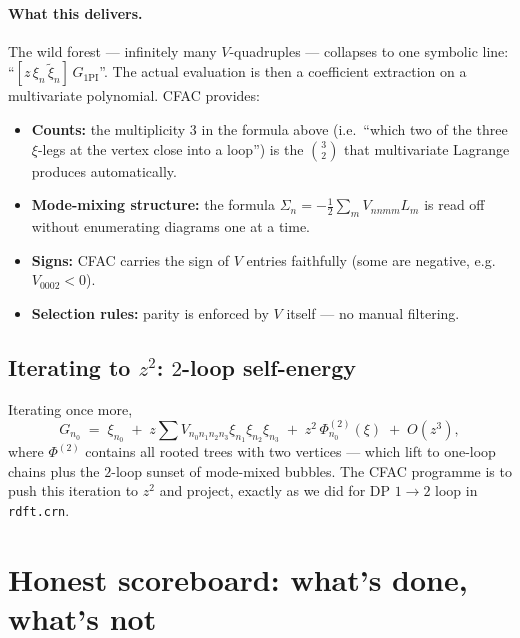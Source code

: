 \documentclass[11pt,a4paper]{article}
\begin{document}
\paragraph{What this delivers.} The wild forest --- infinitely many $V$-quadruples ---
collapses to one symbolic line: ``$[z\,\xi_{n}\,\widetilde\xi_{n}]\,G_{\text{1PI}}$''.
The actual evaluation is then a coefficient extraction on a multivariate polynomial. CFAC
provides:
\begin{itemize}[leftmargin=2em,itemsep=2pt,topsep=2pt]
\item \textbf{Counts:} the multiplicity $3$ in the formula above (i.e.\ ``which two of
the three $\xi$-legs at the vertex close into a loop'') is the $\binom{3}{2}$ that
multivariate Lagrange produces automatically.
\item \textbf{Mode-mixing structure:} the formula $\Sigma_{n} = -\tfrac{1}{2}\sum_{m}
V_{nnmm}L_{m}$ is read off without enumerating diagrams one at a time.
\item \textbf{Signs:} CFAC carries the sign of $V$ entries faithfully (some are
negative, e.g.\ $V_{0002}<0$).
\item \textbf{Selection rules:} parity is enforced by $V$ itself --- no manual filtering.
\end{itemize}

\subsection{Iterating to $z^{2}$: $2$-loop self-energy}

Iterating once more,
\[
G_{n_{0}} \;=\; \xi_{n_{0}} \;+\; z\!\sum V_{n_{0}n_{1}n_{2}n_{3}}\xi_{n_{1}}\xi_{n_{2}}\xi_{n_{3}}
\;+\; z^{2}\,\Phi_{n_{0}}^{(2)}(\xi)\;+\;O(z^{3}),
\]
where $\Phi^{(2)}$ contains all rooted trees with two vertices --- which lift to one-loop
chains plus the $2$-loop sunset of mode-mixed bubbles. The CFAC programme is to push this
iteration to $z^{2}$ and project, exactly as we did for DP $1\to 2$ loop in
\texttt{rdft.crn}.

\section{Honest scoreboard: what's done, what's not}
\end{document}
